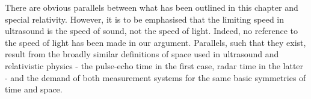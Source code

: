 There are obvious parallels between what has been outlined in this chapter
and special relativity.  
However, it is to be emphasised that the limiting speed in ultrasound is the speed of sound, not the speed of light.
Indeed, no reference to the speed of light has been made in our argument.
Parallels, such that they exist, result from the broadly similar definitions of space used in ultrasound and relativistic physics -
the pulse-echo time in the first case, radar time\cite{Dolby2001} in the latter - and the demand of both measurement systems for the same basic symmetries of time and space.


























